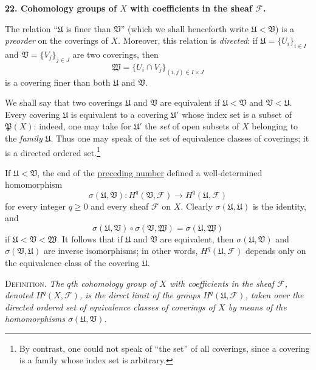 
\medskip
{}\label{fac:I:3:no:22}
\textbf{22. Cohomology groups of $X$ with coefficients in the sheaf $\mathcal{F}$.}

The relation ``$\mathfrak{U}$ is finer than $\mathfrak{V}$'' (which we shall henceforth write $\mathfrak{U}<\mathfrak{V}$) is a \textit{preorder} on the coverings of $X$. Moreover, this relation is \textit{directed}: if $\mathfrak{U}=\{U_i\}_{i\in I}$ and $\mathfrak{V}=\{V_j\}_{j\in J}$ are two coverings, then
\[
\mathfrak{W}=\{U_i\cap V_j\}_{(i,j)\in I\times J}
\]
is a covering finer than both $\mathfrak{U}$ and $\mathfrak{V}$.

We shall say that two coverings $\mathfrak{U}$ and $\mathfrak{V}$ are equivalent if $\mathfrak{U}<\mathfrak{V}$ and $\mathfrak{V}<\mathfrak{U}$. Every covering $\mathfrak{U}$ is equivalent to a covering $\mathfrak{U}'$ whose index set is a subset of $\mathfrak{P}(X)$: indeed, one may take for $\mathfrak{U}'$ the \textit{set} of open subsets of $X$ belonging to the \textit{family} $\mathfrak{U}$. Thus one may speak of the set of equivalence classes of coverings; it is a directed ordered set.\footnote{By contrast, one could not speak of ``the set'' of all coverings, since a covering is a family whose index set is arbitrary.}

If $\mathfrak{U}<\mathfrak{V}$, the end of the \hyperref[fac:I:3:no:21]{preceding number} defined a well-determined homomorphism
\[
\sigma(\mathfrak{U},\mathfrak{V}):
H^q(\mathfrak{V},\mathcal{F})\longrightarrow
H^q(\mathfrak{U},\mathcal{F})
\]
for every integer $q\geq0$ and every sheaf $\mathcal{F}$ on $X$. Clearly $\sigma(\mathfrak{U},\mathfrak{U})$ is the identity, and
\[
\sigma(\mathfrak{U},\mathfrak{V})\circ
\sigma(\mathfrak{V},\mathfrak{W})
=\sigma(\mathfrak{U},\mathfrak{W})
\]
if $\mathfrak{U}<\mathfrak{V}<\mathfrak{W}$. It follows that if $\mathfrak{U}$ and $\mathfrak{V}$ are equivalent, then $\sigma(\mathfrak{U},\mathfrak{V})$ and $\sigma(\mathfrak{V},\mathfrak{U})$ are inverse isomorphisms; in other words, $H^q(\mathfrak{U},\mathcal{F})$ depends only on the equivalence class of the covering $\mathfrak{U}$.

\label{fac:I:3:no:22:def:1}
\textsc{Definition.} \textit{The $q$th cohomology group of $X$ with coefficients in the sheaf $\mathcal{F}$, denoted $H^q(X,\mathcal{F})$, is the direct limit of the groups $H^q(\mathfrak{U},\mathcal{F})$, taken over the directed ordered set of equivalence classes of coverings of $X$ by means of the homomorphisms $\sigma(\mathfrak{U},\mathfrak{V})$.}

